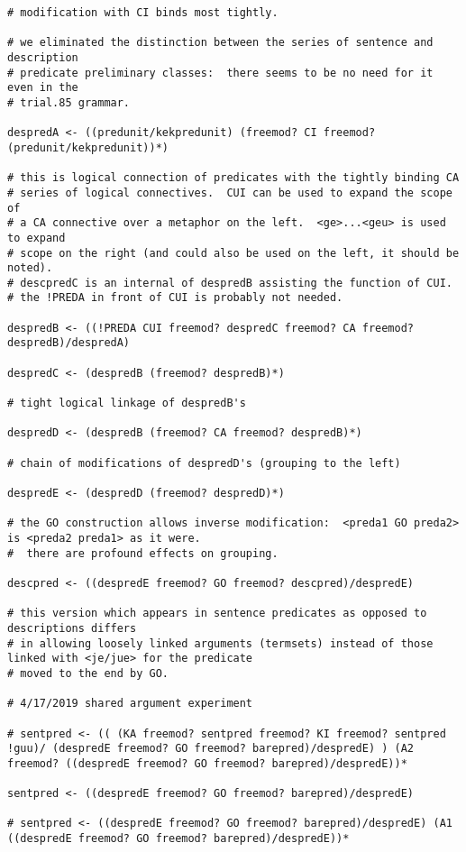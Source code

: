 \documentclass[12pt]{book}
\begin{document}
{\begin{verbatim}
# modification with CI binds most tightly.

# we eliminated the distinction between the series of sentence and description
# predicate preliminary classes:  there seems to be no need for it even in the 
# trial.85 grammar.

despredA <- ((predunit/kekpredunit) (freemod? CI freemod? (predunit/kekpredunit))*)

# this is logical connection of predicates with the tightly binding CA
# series of logical connectives.  CUI can be used to expand the scope of
# a CA connective over a metaphor on the left.  <ge>...<geu> is used to expand
# scope on the right (and could also be used on the left, it should be noted).
# descpredC is an internal of despredB assisting the function of CUI.
# the !PREDA in front of CUI is probably not needed.

despredB <- ((!PREDA CUI freemod? despredC freemod? CA freemod? despredB)/despredA)

despredC <- (despredB (freemod? despredB)*)

# tight logical linkage of despredB's

despredD <- (despredB (freemod? CA freemod? despredB)*)

# chain of modifications of despredD's (grouping to the left)

despredE <- (despredD (freemod? despredD)*)

# the GO construction allows inverse modification:  <preda1 GO preda2> is <preda2 preda1> as it were.
#  there are profound effects on grouping.

descpred <- ((despredE freemod? GO freemod? descpred)/despredE)

# this version which appears in sentence predicates as opposed to descriptions differs
# in allowing loosely linked arguments (termsets) instead of those linked with <je/jue> for the predicate
# moved to the end by GO.

# 4/17/2019 shared argument experiment

# sentpred <- (( (KA freemod? sentpred freemod? KI freemod? sentpred !guu)/ (despredE freemod? GO freemod? barepred)/despredE) ) (A2 freemod? ((despredE freemod? GO freemod? barepred)/despredE))*

sentpred <- ((despredE freemod? GO freemod? barepred)/despredE)

# sentpred <- ((despredE freemod? GO freemod? barepred)/despredE) (A1 ((despredE freemod? GO freemod? barepred)/despredE))*


\end{verbatim}}
\end{document}
